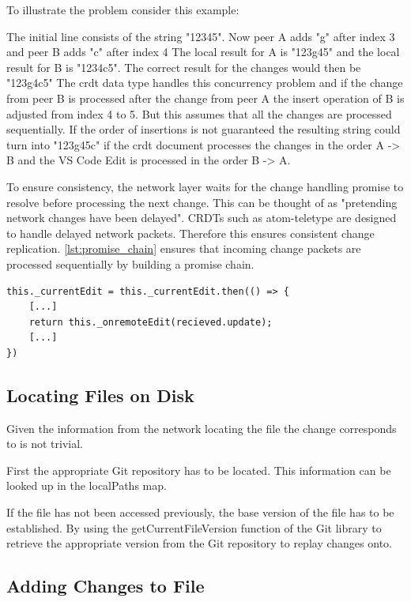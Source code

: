 To illustrate the problem consider this example:

The initial line consists of the string "12345".
Now peer A adds "g" after index 3 and peer B adds "c" after index 4
The local result for A is "123g45" and the local result for B is "1234c5".
The correct result for the changes would then be "123g4c5"
The crdt data type handles this concurrency problem and if the change from peer B is processed after the change from peer A the insert operation of B is adjusted from index 4 to 5.
But this assumes that all the changes are processed sequentially. If the order of insertions is not guaranteed the resulting string could turn into "123g45c" if the crdt document processes the changes in the order A -> B and the VS Code Edit is processed in the order B -> A.

To ensure consistency, the network layer waits for the change handling promise to resolve before processing the next change. This can be thought of as "pretending network changes have been delayed".
CRDTs such as atom-teletype are designed to handle delayed network packets. Therefore this ensures consistent change replication. \autoref{lst:promise_chain} ensures that incoming change packets are processed sequentially by building a promise chain.

\begin{lstlisting}[label={lst:promise_chain}, caption=Network Promise Chain]
this._currentEdit = this._currentEdit.then(() => {
    [...]
    return this._onremoteEdit(recieved.update);
    [...]
})
\end{lstlisting}

\subsection{Locating Files on Disk}

Given the information from the network locating the file the change corresponds to is not trivial.

First the appropriate Git repository has to be located.
This information can be looked up in the localPaths map.

If the file has not been accessed previously, the base version of the file has to be established.
By using the getCurrentFileVersion function of the Git library to retrieve the appropriate version from the Git repository to replay changes onto.

\subsection{Adding Changes to File}

